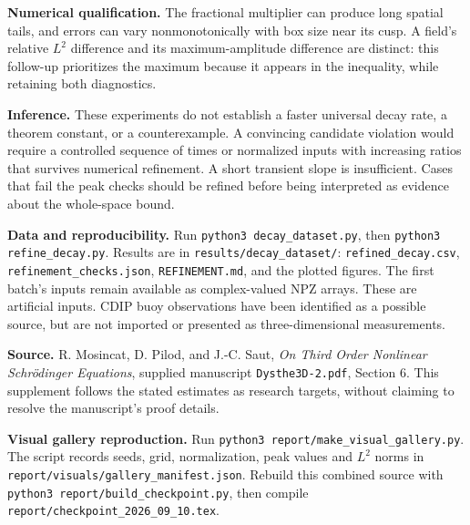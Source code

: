 \documentclass[10pt,letterpaper]{article}
\begin{document}
\textbf{Numerical qualification.} \CheckResult
The fractional multiplier can produce long spatial tails, and errors can vary
nonmonotonically with box size near its cusp. A field's relative $L^2$ difference
and its maximum-amplitude difference are distinct: this follow-up prioritizes the
maximum because it appears in the inequality, while retaining both diagnostics.

\textbf{Inference.} These experiments do not establish a faster universal decay
rate, a theorem constant, or a counterexample. A convincing candidate violation
would require a controlled sequence of times or normalized inputs with increasing
ratios that survives numerical refinement. A short transient slope is insufficient.
Cases that fail the peak checks should be refined before being interpreted as
evidence about the whole-space bound.

\textbf{Data and reproducibility.} Run \texttt{python3 decay\_dataset.py}, then
\texttt{python3 refine\_decay.py}. Results are in
\texttt{results/decay\_dataset/}: \texttt{refined\_decay.csv},
\texttt{refinement\_checks.json}, \texttt{REFINEMENT.md}, and the plotted figures.
The first batch's inputs remain available as complex-valued NPZ arrays.
These are artificial inputs. CDIP buoy observations have been identified as a
possible source, but are not imported or presented as three-dimensional measurements.

\textbf{Source.} R. Mosincat, D. Pilod, and J.-C. Saut,
\emph{On Third Order Nonlinear Schr\"odinger Equations}, supplied manuscript
\texttt{Dysthe3D-2.pdf}, Section 6. This supplement follows the stated estimates
as research targets, without claiming to resolve the manuscript's proof details.

\textbf{Visual gallery reproduction.} Run \texttt{python3 report/make\_visual\_gallery.py}.
The script records seeds, grid, normalization, peak values and $L^2$ norms in
\texttt{report/visuals/gallery\_manifest.json}. Rebuild this combined source with
\texttt{python3 report/build\_checkpoint.py}, then compile \texttt{report/checkpoint\_2026\_09\_10.tex}.
\newpage
{}\label{longmethods}
\end{document}
